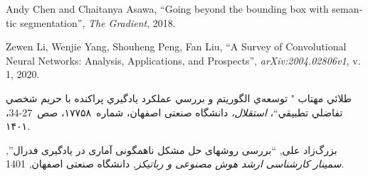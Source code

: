 \begin{thebibliography}{99}
\begin{latin}
 Andy Chen and Chaitanya Asawa, “Going beyond the bounding box with semantic segmentation”, \textit{The Gradient}, 2018.

Zewen Li, Wenjie Yang, Shouheng Peng, Fan Liu, “A Survey of Convolutional Neural Networks: Analysis, Applications, and Prospects”, \textit{arXiv:2004.02806v1}, v. 1, 2020.

\end{latin}



طلائي مهتاب "	توسعه‌ي الگوريتم و بررسي عملكرد يادگيري پراكنده با حريم شخصي تفاضلي تطبيقي``، \textit{استقلال،} دانشگاه صنعتی اصفهان، شماره~۱۷۷۵۸، صص~27-34، ۱۴۰۱.

 بزرگ‌زاد علی, “بررسی روشهای حل مشکل ناهمگونی آماری در یادگیری فدرال”, \textit{سمینار کارشناسی ارشد هوش مصنوعی و رباتیکز}, دانشگاه صنعتی اصفهان, 1401. 

\end{thebibliography}

